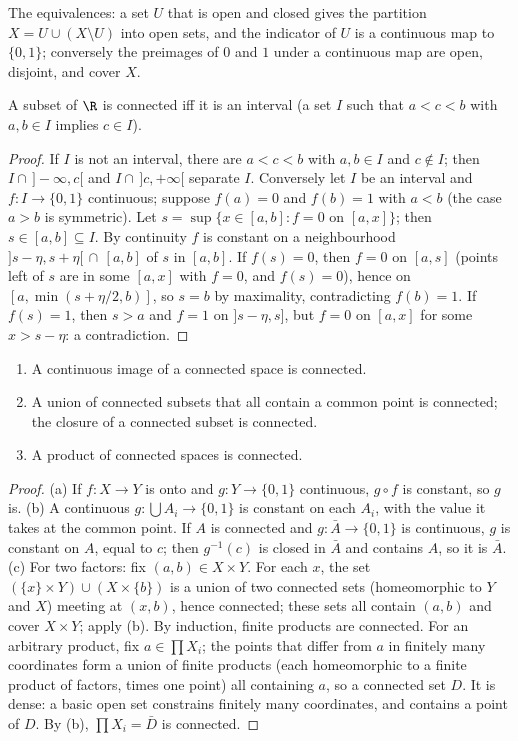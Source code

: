 The equivalences: a set $U$ that is open and closed gives the partition $X=U\cup(X\setminus U)$ into open sets, and the indicator of $U$ is a
continuous map to $\{0,1\}$; conversely the preimages of $0$ and $1$ under a continuous map are open, disjoint, and cover $X$.

\begin{theorem}\label{thm:intervals}
A subset of $\R$ is connected iff it is an interval (a set $I$ such that $a<c<b$ with $a,b\in I$ implies $c\in I$).
\end{theorem}
\begin{proof}
If $I$ is not an interval, there are $a<c<b$ with $a,b\in I$ and $c\notin I$; then $I\cap\,]-\infty,c[$ and $I\cap\,]c,+\infty[$ separate $I$. Conversely let $I$ be an
interval and $f:I\to\{0,1\}$ continuous; suppose $f(a)=0$ and $f(b)=1$ with $a<b$ (the case $a>b$ is symmetric). Let $s=\sup\{x\in[a,b]:f=0\text{ on }[a,x]\}$; then
$s\in[a,b]\subseteq I$. By continuity $f$ is constant on a neighbourhood $]s-\eta,s+\eta[\,\cap\,[a,b]$ of $s$ in $[a,b]$. If $f(s)=0$, then $f=0$ on $[a,s]$ (points left of $s$ are
in some $[a,x]$ with $f=0$, and $f(s)=0$), hence on $[a,\min(s+\eta/2,b)]$, so $s=b$ by maximality, contradicting $f(b)=1$. If $f(s)=1$, then $s>a$
and $f=1$ on $]s-\eta,s]$, but $f=0$ on $[a,x]$ for some $x>s-\eta$: a contradiction.
\end{proof}

\begin{proposition}\label{prop:connected}
\begin{enumerate}[label=(\alph*)]
\item A continuous image of a connected space is connected.
\item A union of connected subsets that all contain a common point is connected; the closure of a connected subset is connected.
\item A product of connected spaces is connected.
\end{enumerate}
\end{proposition}
\begin{proof}
(a) If $f:X\to Y$ is onto and $g:Y\to\{0,1\}$ continuous, $g\circ f$ is constant, so $g$ is. (b) A continuous $g:\bigcup A_i\to\{0,1\}$ is constant on each $A_i$,
with the value it takes at the common point. If $A$ is connected and $g:\bar A\to\{0,1\}$ is continuous, $g$ is constant on $A$, equal to $c$; then
$g^{-1}(c)$ is closed in $\bar A$ and contains $A$, so it is $\bar A$. (c) For two factors: fix $(a,b)\in X\times Y$. For each $x$, the set
$(\{x\}\times Y)\cup(X\times\{b\})$ is a union of two connected sets (homeomorphic to $Y$ and $X$) meeting at $(x,b)$, hence connected; these sets all
contain $(a,b)$ and cover $X\times Y$; apply (b). By induction, finite products are connected. For an arbitrary product, fix $a\in\prod X_i$; the
points that differ from $a$ in finitely many coordinates form a union of finite products (each homeomorphic to a finite product of
factors, times one point) all containing $a$, so a connected set $D$. It is dense: a basic open set constrains finitely many coordinates,
and contains a point of $D$. By (b), $\prod X_i=\bar D$ is connected.
\end{proof}

